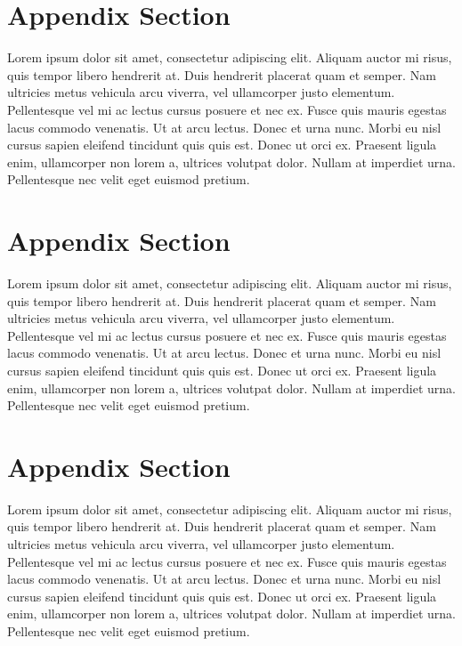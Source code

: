 \documentclass[
	a4paper, %
	12pt, %
]{persist}
\begin{document}
\begin{appendices}

\section{Appendix Section}

Lorem ipsum dolor sit amet, consectetur adipiscing elit. Aliquam auctor mi risus, quis tempor libero hendrerit at. Duis hendrerit placerat quam et semper. Nam ultricies metus vehicula arcu viverra, vel ullamcorper justo elementum. Pellentesque vel mi ac lectus cursus posuere et nec ex. Fusce quis mauris egestas lacus commodo venenatis. Ut at arcu lectus. Donec et urna nunc. Morbi eu nisl cursus sapien eleifend tincidunt quis quis est. Donec ut orci ex. Praesent ligula enim, ullamcorper non lorem a, ultrices volutpat dolor. Nullam at imperdiet urna. Pellentesque nec velit eget euismod pretium.

\section{Appendix Section}

Lorem ipsum dolor sit amet, consectetur adipiscing elit. Aliquam auctor mi risus, quis tempor libero hendrerit at. Duis hendrerit placerat quam et semper. Nam ultricies metus vehicula arcu viverra, vel ullamcorper justo elementum. Pellentesque vel mi ac lectus cursus posuere et nec ex. Fusce quis mauris egestas lacus commodo venenatis. Ut at arcu lectus. Donec et urna nunc. Morbi eu nisl cursus sapien eleifend tincidunt quis quis est. Donec ut orci ex. Praesent ligula enim, ullamcorper non lorem a, ultrices volutpat dolor. Nullam at imperdiet urna. Pellentesque nec velit eget euismod pretium.

\section{Appendix Section}

Lorem ipsum dolor sit amet, consectetur adipiscing elit. Aliquam auctor mi risus, quis tempor libero hendrerit at. Duis hendrerit placerat quam et semper. Nam ultricies metus vehicula arcu viverra, vel ullamcorper justo elementum. Pellentesque vel mi ac lectus cursus posuere et nec ex. Fusce quis mauris egestas lacus commodo venenatis. Ut at arcu lectus. Donec et urna nunc. Morbi eu nisl cursus sapien eleifend tincidunt quis quis est. Donec ut orci ex. Praesent ligula enim, ullamcorper non lorem a, ultrices volutpat dolor. Nullam at imperdiet urna. Pellentesque nec velit eget euismod pretium.

\end{appendices}

\end{document}
